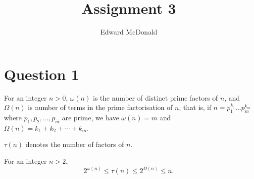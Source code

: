 \documentclass{unswmaths}
\begin{document}
\subject{Number Theory}
\author{Edward McDonald}
\title{Assignment 3}


\setlength\parindent{0pt}

\unswtitle{}

\section*{Question 1}

\begin{definition}
    For an integer $n > 0$, $\omega(n)$ is the number of distinct prime factors of $n$, and $\Omega(n)$
    is number of terms in the prime factorisation of $n$, that is, if $n = p_1^{k_1}\ldots p_m^{k_m}$
    where $p_1,p_2,\ldots,p_m$ are prime, we have $\omega(n) = m$ and $\Omega(n) = k_1+k_2+\cdots+k_m$.
    
    $\tau(n)$ denotes the number of factors of $n$.
\end{definition}
\begin{lemma}
    For an integer $n > 2$,
    \begin{equation*}
        2^{\omega(n)}\leq \tau(n) \leq 2^{\Omega(n)}\leq n.
    \end{equation*}
\end{lemma}
\end{document}
